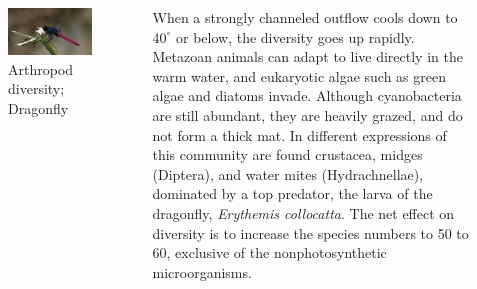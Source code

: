 \documentclass[
  ignorenonframetext,
  aspectratio=169]{beamer}
\begin{document}
\begin{frame}{}
\protect\hypertarget{section-3}{}
\begin{columns}[T,totalwidth=\textwidth]

\begin{figure}
\includegraphics[width=0.9\linewidth]{./../images/twttr/dragonfly_D7is9PFUEAAoQyS} \caption{Arthropod diversity; Dragonfly}\label{fig:dragonfly}
\end{figure}

{\footnotesize When a strongly channeled outflow cools down to $40^\circ$ or below, the diversity goes up rapidly. Metazoan animals can adapt to live directly in the warm water, and eukaryotic algae such as green algae and diatoms invade. Although cyanobacteria are still abundant, they are heavily grazed, and do not form a thick mat. In different expressions of this community are found crustacea, midges (Diptera), and water mites (Hydrachnellae), dominated by a top predator, the larva of the dragonfly, \textit{Erythemis collocatta}. The net effect on diversity is to increase the species numbers to 50 to 60, exclusive of the nonphotosynthetic microorganisms.}

\end{columns}
\end{frame}
\end{document}
